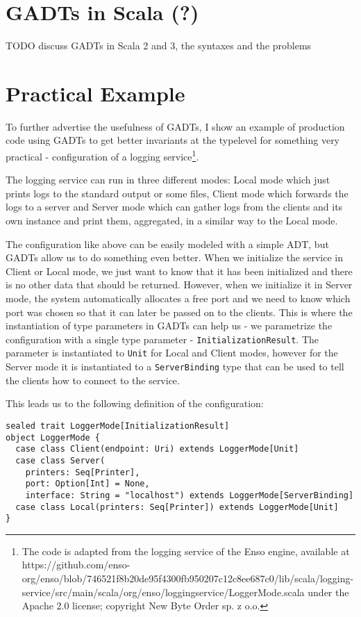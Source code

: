 \section{GADTs in Scala (?)}

TODO discuss GADTs in Scala 2 and 3, the syntaxes and the problems


\section{Practical Example}

To further advertise the usefulness of GADTs, I show an example of production code using GADTs to get better invariants at the typelevel for something very practical - configuration of a logging service\footnote{The code is adapted from the logging service of the Enso engine, available at https://github.com/enso-org/enso/blob/746521f8b20de95f4300fb950207c12c8ee687c0/lib/scala/logging-service/src/main/scala/org/enso/loggingservice/LoggerMode.scala under the Apache 2.0 license; copyright New Byte Order sp. z o.o.}.

The logging service can run in three different modes: Local mode which just prints logs to the standard output or some files, Client mode which forwards the logs to a server and Server mode which can gather logs from the clients and its own instance and print them, aggregated, in a similar way to the Local mode.

The configuration like above can be easily modeled with a simple ADT, but GADTs allow us to do something even better. When we initialize the service in Client or Local mode, we just want to know that it has been initialized and there is no other data that should be returned. However, when we initialize it in Server mode, the system automatically allocates a free port and we need to know which port was chosen so that it can later be passed on to the clients. This is where the instantiation of type parameters in GADTs can help us - we parametrize the configuration with a single type parameter - \texttt{InitializationResult}. The parameter is instantiated to \texttt{Unit} for Local and Client modes, however for the Server mode it is instantiated to a \texttt{ServerBinding} type that can be used to tell the clients how to connect to the service.

This leads us to the following definition of the configuration:

\begin{verbatim}
sealed trait LoggerMode[InitializationResult]
object LoggerMode {
  case class Client(endpoint: Uri) extends LoggerMode[Unit]
  case class Server(
    printers: Seq[Printer], 
    port: Option[Int] = None, 
    interface: String = "localhost") extends LoggerMode[ServerBinding]
  case class Local(printers: Seq[Printer]) extends LoggerMode[Unit]
}
\end{verbatim}

